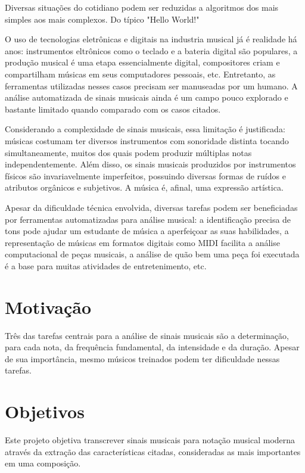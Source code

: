 \label{introducao}

Diversas situações do cotidiano podem ser reduzidas a algoritmos dos mais simples aos mais complexos. Do típico "Hello World!"

O uso de tecnologias eletrônicas e digitais na industria musical já é realidade há anos: instrumentos eltrônicos como o teclado e a bateria digital são populares, a produção musical é uma etapa essencialmente digital, compositores criam e compartilham músicas em seus computadores pessoais, etc. Entretanto, as ferramentas utilizadas nesses casos precisam ser manuseadas por um humano. A análise automatizada de sinais musicais ainda é um campo pouco explorado e bastante limitado quando comparado com os casos citados.

Considerando a complexidade de sinais musicais, essa limitação é justificada: músicas costumam ter diversos instrumentos com sonoridade distinta tocando simultaneamente, muitos dos quais podem produzir múltiplas notas independentemente. Além disso, os sinais musicais produzidos por instrumentos físicos são invariavelmente imperfeitos, possuindo diversas formas de ruídos e atributos orgânicos e subjetivos. A música é, afinal, uma expressão artística.

Apesar da dificuldade técnica envolvida, diversas tarefas podem ser beneficiadas por ferramentas automatizadas para análise musical: a identificação precisa de tons pode ajudar um estudante de música a aperfeiçoar as suas habilidades, a representação de músicas em formatos digitais como MIDI facilita a análise computacional de peças musicais, a análise de quão bem uma peça foi executada é a base para muitas atividades de entretenimento, etc.

\section{Motivação}

Três das tarefas centrais para a análise de sinais musicais são a determinação, para cada nota, da frequência fundamental, da intensidade e da duração. Apesar de sua importância, mesmo músicos treinados podem ter dificuldade nessas tarefas.

\section{Objetivos}

Este projeto objetiva transcrever sinais musicais para notação musical moderna através da extração das características citadas, consideradas as mais importantes em uma composição.

